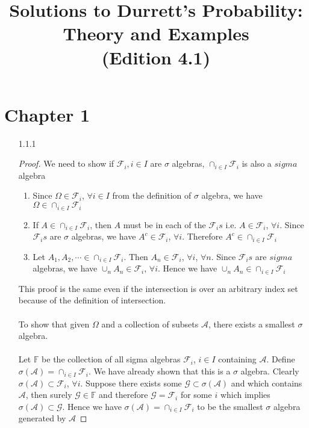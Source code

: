 \documentclass[a4paper,english,10pt]{article}
\title{Solutions to Durrett's Probability: Theory and Examples \\(Edition 4.1)}
\date{}
\begin{document}
\maketitle
\section*{Chapter 1}
\begin{enumerate}
\item[1.1.1]
\begin{proof} 
We need to show if $\mathcal{F}_i, i\in I$ are $\sigma$ algebras, $\cap_{i \in I} \mathcal{F}_i$ is also a $sigma$ algebra
\begin{enumerate}
\item Since $\Omega \in \mathcal{F}_i$, $ \forall i\in I$  from the definition of $\sigma$ algebra, we have
$\Omega \in \cap_{i \in I} \mathcal{F}_i$
\item If $A\in \cap_{i \in I} \mathcal{F}_i$, then $A$ must be in each of the $\mathcal{F}_is$ i.e. 
$A\in \mathcal{F}_i$, $ \forall i$. Since $\mathcal{F}_is$ are $\sigma$ algebras, we have $A^c \in \mathcal{F}_i$, $ \forall i$. Therefore $A^c \in \cap_{i \in I} \mathcal{F}_i$
\item Let $A_1,A_2,\cdots \in \cap_{i \in I} \mathcal{F}_i$. Then $A_n \in \mathcal{F}_i$, $\forall i$, $\forall n$. Since $\mathcal{F}_is$ are $sigma$ algebras, we have $\cup_n A_n \in \mathcal{F}_i $, $\forall i$. Hence we have $\cup_n A_n \in  \cap_{i \in I} \mathcal{F}_i$
\end{enumerate}
This proof is the same even if the intersection is over an arbitrary index set because of the definition of intersection.
\\\\
To show that given $\Omega$ and a collection of subsets
$\mathcal{A}$, there exists a smallest $\sigma$ algebra.\\\\
Let $\mathbb{F}$ be the collection of all sigma algebras $\mathcal{F}_i$, $i\in I$ containing $\mathcal{A}$. Define $\sigma(\mathcal{A})=\cap_{i \in I} \mathcal{F}_i$. We have already shown that this is a $\sigma$ algebra. Clearly $\sigma(\mathcal{A}) \subset \mathcal{F}_i$, $\forall i$. Suppose there exists some $\mathcal{G} \subset \sigma(\mathcal{A})$ and which contains $\mathcal{A}$, then surely $\mathcal{G}\in \mathbb{F}$ and therefore $\mathcal{G}=\mathcal{F}_i$ for some $i$ which implies $\sigma(\mathcal{A}) \subset \mathcal{G}$. Hence we have $\sigma(\mathcal{A})=\cap_{i \in I} \mathcal{F}_i$ to be the smallest $\sigma$ algebra generated by $\mathcal{A}$
\end{proof}



\end{enumerate}
\end{document}
